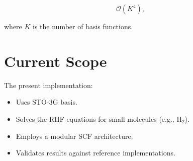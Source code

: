 \documentclass[11pt]{article}
\begin{document}
\[
\mathcal{O}(K^4),
\]

where $K$ is the number of basis functions.

\section{Current Scope}

The present implementation:

\begin{itemize}
\item Uses STO-3G basis.
\item Solves the RHF equations for small molecules (e.g., H$_2$).
\item Employs a modular SCF architecture.
\item Validates results against reference implementations.
\end{itemize}
\end{document}
